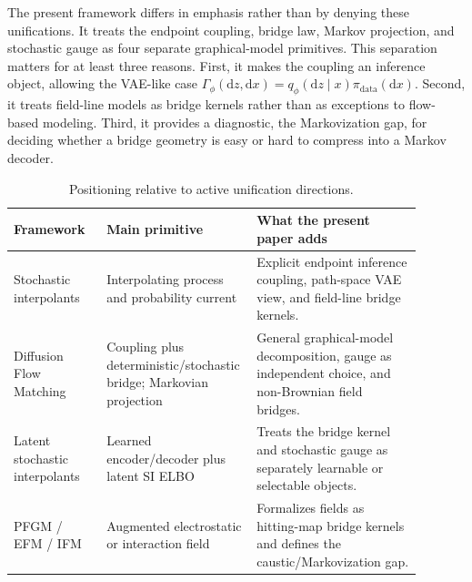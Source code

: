 \documentclass[twoside,11pt]{jmlr}
\numberwithin{equation}{section}
\newcommand{\dd}{\mathrm{d}}
\newcommand{\pdata}{\pi_{\mathrm{data}}}
\begin{document}
The present framework differs in emphasis rather than by denying these unifications. It treats the endpoint coupling, bridge law, Markov projection, and stochastic gauge as four separate graphical-model primitives. This separation matters for at least three reasons. First, it makes the coupling an inference object, allowing the VAE-like case $\Gamma_\phi(\dd z,\dd x)=q_\phi(\dd z\mid x)\pdata(\dd x)$. Second, it treats field-line models as bridge kernels rather than as exceptions to flow-based modeling. Third, it provides a diagnostic, the Markovization gap, for deciding whether a bridge geometry is easy or hard to compress into a Markov decoder.

\begin{table}[t]
\centering
\small
\begin{tabular}{@{}p{0.22\linewidth}p{0.28\linewidth}p{0.39\linewidth}@{}}
\toprule
Framework & Main primitive & What the present paper adds \\
\midrule
Stochastic interpolants & Interpolating process and probability current & Explicit endpoint inference coupling, path-space VAE view, and field-line bridge kernels. \\
Diffusion Flow Matching & Coupling plus deterministic/stochastic bridge; Markovian projection & General graphical-model decomposition, gauge as independent choice, and non-Brownian field bridges. \\
Latent stochastic interpolants & Learned encoder/decoder plus latent SI ELBO & Treats the bridge kernel and stochastic gauge as separately learnable or selectable objects. \\
PFGM / EFM / IFM & Augmented electrostatic or interaction field & Formalizes fields as hitting-map bridge kernels and defines the caustic/Markovization gap. \\
\bottomrule
\end{tabular}
\caption{Positioning relative to active unification directions.}
\label{tab:related_positioning}
\end{table}
\end{document}
